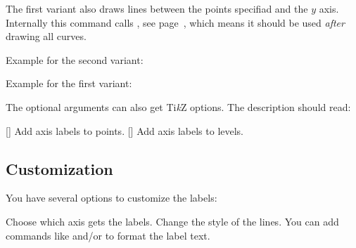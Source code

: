 \documentclass[load-preamble+]{cnltx-doc}
\newcommand*\TikZ{Ti\textit{k}Z}
\begin{document}
The first variant also draws lines between the points specifiad and the $y$
axis.  Internally this command calls , see
page~\pageref{cmd:makeorigin}, which means it should be used \emph{after}
drawing all curves.

Example for the second variant:
\begin{example}
  \begin{endiagram}[y-label=above]
  \end{endiagram}
  \begin{endiagram}[y-label=above]
  \end{endiagram}
\end{example}

Example for the first variant:
\begin{example}
  \begin{endiagram}[y-label=above]
  \end{endiagram}
\end{example}

The optional arguments can also get \TikZ{} options. The description should read:
\begin{commands}
  []
    Add axis labels to points.
  [\sarg{}]
    Add axis labels to levels.
\end{commands}

\begin{example}
  \begin{endiagram}[y-label=above]
  \end{endiagram}
  \begin{endiagram}[y-label=above]
  \end{endiagram}
\end{example}

\subsection{Customization}

You have several options to customize the labels:
\begin{options}
    Choose which axis gets the labels.
    Change the style of the lines.
  \Default
    You can add commands like  and/or 
    to format the label text.
\end{options}
\end{document}
